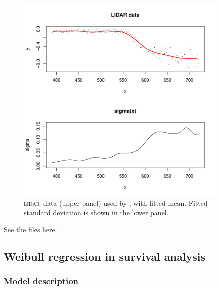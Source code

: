 \documentclass{admbmanual}
\newcommand{\citeasnoun}{\cite}
\newcommand{\scLIDAR}{\textsc{lidar}}
\begin{document}
\begin{figure}[h]
  \centering\hskip1pt
  \includegraphics[width=4in]{lidar_fig.pdf}
   \caption{\scLIDAR\ data (upper panel) used by
     \protect\citeasnoun{rupp:wand:carr:2003}, with fitted mean. Fitted standard
     deviation is shown in the lower panel.}
  \label{fig:lidar}
\end{figure}

See the files
\href{http://otter-rsch.com/admbre/examples/lidar/lidar.html}{here}.

\subsection{Weibull regression in survival analysis}
\subsubsection{Model description}
\end{document}
